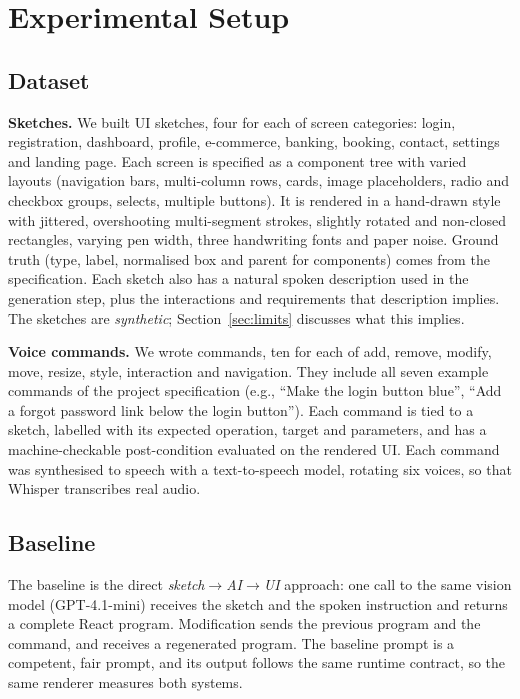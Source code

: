 \section{Experimental Setup}
\subsection{Dataset}
\textbf{Sketches.} We built \CountSketches{} UI sketches, four for each of \CountCategories{} screen categories: login, registration, dashboard, profile, e-commerce, banking, booking, contact, settings and landing page. Each screen is specified as a component tree with varied layouts (navigation bars, multi-column rows, cards, image placeholders, radio and checkbox groups, selects, multiple buttons). It is rendered in a hand-drawn style with jittered, overshooting multi-segment strokes, slightly rotated and non-closed rectangles, varying pen width, three handwriting fonts and paper noise. Ground truth (type, label, normalised box and parent for \CountGtComponents{} components) comes from the specification. Each sketch also has a natural spoken description used in the generation step, plus the interactions and requirements that description implies. The sketches are \emph{synthetic}; Section~\ref{sec:limits} discusses what this implies.

\textbf{Voice commands.} We wrote \CountCommands{} commands, ten for each of add, remove, modify, move, resize, style, interaction and navigation. They include all seven example commands of the project specification (e.g., ``Make the login button blue'', ``Add a forgot password link below the login button''). Each command is tied to a sketch, labelled with its expected operation, target and parameters, and has a machine-checkable post-condition evaluated on the rendered UI. Each command was synthesised to speech with a text-to-speech model, rotating six voices, so that Whisper transcribes real audio.

\subsection{Baseline}
The baseline is the direct \emph{sketch$\rightarrow$AI$\rightarrow$UI} approach: one call to the same vision model (GPT-4.1-mini) receives the sketch and the spoken instruction and returns a complete React program. Modification sends the previous program and the command, and receives a regenerated program. The baseline prompt is a competent, fair prompt, and its output follows the same runtime contract, so the same renderer measures both systems.

